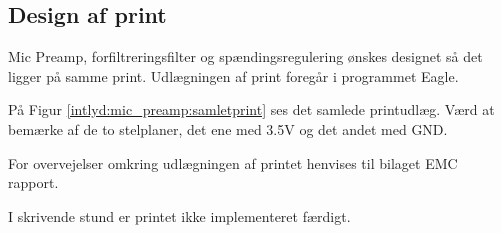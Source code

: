 \subsection*{Design af print}
Mic Preamp, forfiltreringsfilter og spændingsregulering ønskes designet så det ligger på samme print. Udlægningen af print foregår i programmet Eagle. 

På Figur \ref{intlyd:mic_preamp:samletprint} ses det samlede printudlæg. Værd at bemærke af de to stelplaner, det ene med 3.5V og det andet med GND. 


For overvejelser omkring udlægningen af printet henvises til bilaget EMC rapport. 

I skrivende stund er printet ikke implementeret færdigt. 




